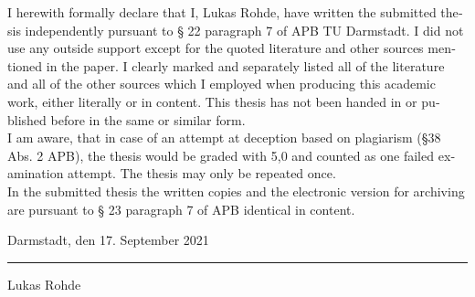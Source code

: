 \documentclass[11pt,longdoc,accentcolor=tud1b,paper=a4]{tuddesign/tudreport}
\newcounter{dummy} %
\newcommand{\komName}{Lukas Rohde\xspace}
\newcommand{\komSubmissionDate}{17. September 2021\xspace}%
\begin{document}
\begin{otherlanguage}{ngerman}
{	\noindent I herewith formally declare that I, \komName, have written the submitted thesis independently pursuant to § 22 paragraph 7 of APB TU Darmstadt. 
	I did not use any outside support except for the quoted literature and other sources mentioned in the paper. 
	I clearly marked and separately listed all of the literature and all of the other sources which I employed when producing this academic work, either literally or in content.
	This thesis has not been handed in or published before in the same or similar form. \\

	\noindent I am aware, that in case of an attempt at deception based on plagiarism (§38 Abs. 2 APB), the thesis would be graded with 5,0 and counted as one failed examination attempt. 
	The thesis may only be repeated once. \\
	
    \noindent In the submitted thesis the written copies and the electronic version for archiving are pursuant to § 23 paragraph 7 of APB identical in content.
    
	}{}	
    \vspace{4em}
    
    \noindent Darmstadt, den \komSubmissionDate 
    
    \vspace{3em}
    
    \noindent\rule{5cm}{0.4pt}
    
    \noindent\komName
    
    \end{otherlanguage}
   
	\tableofcontents
	\listoffigures
	
	\cleardoublepage

	
	
	
	
	
\end{document}
